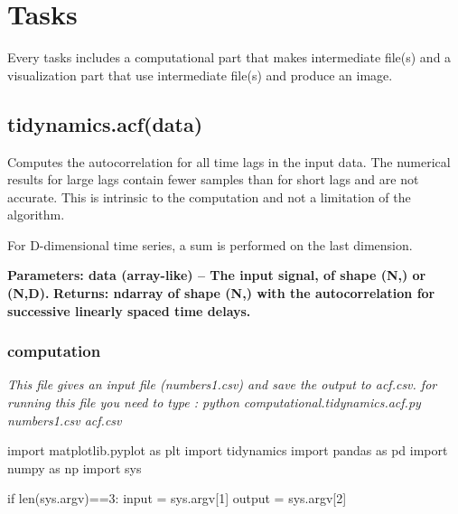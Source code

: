\documentclass[12pt, a4paper, twoside]{report}
\begin{document}
\newpage
\section{Tasks}

Every tasks includes a computational part that makes intermediate file(s) and a visualization part that use intermediate file(s) and produce an image.  

\subsection{tidynamics.acf(data)}
Computes the autocorrelation for all time lags in the input data. The numerical results for large lags contain fewer samples than for short lags and are not accurate. This is intrinsic to the computation and not a limitation of the algorithm.

For D-dimensional time series, a sum is performed on the last dimension.

\textbf{ Parameters:	data (array-like) – The input signal, of shape (N,) or (N,D).}\newline
\textbf{ Returns:	ndarray of shape (N,) with the autocorrelation for successive linearly spaced time delays.}
 
\subsubsection{computation}
 
\textit{This file gives an input file (numbers1.csv) and save the output to acf.csv.\newline
for running this file you need to type : python computational.tidynamics.acf.py numbers1.csv acf.csv\newline}



import matplotlib.pyplot as plt\newline
import tidynamics\newline
import pandas as pd\newline
import numpy as np\newline
import sys\newline

if len(sys.argv)==3:\newline
\hspace*{10mm} input = sys.argv[1]\newline
\hspace*{10mm} output = sys.argv[2]\newline
\end{document}
